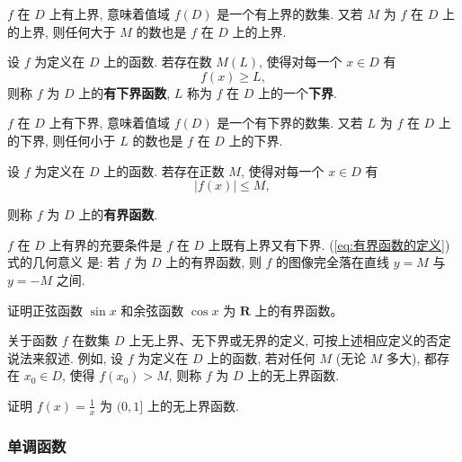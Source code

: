 $f$ 在 $D$ 上有上界, 意味着值域 $f(D)$ 是一个有上界的数集. 又若 $M$ 为 $f$ 在 $D$ 上的上界, 则任何大于 $M$ 的数也是 $f$ 在 $D$ 上的上界.

\begin{definition}[有下界函数]
    设 $f$ 为定义在 $D$ 上的函数. 若存在数 $M(L)$, 使得对每一个 $x \in D$ 有
    $$
    f(x) \geqslant L,
    $$
    则称 $f$ 为 $D$ 上的\textcolor{third}{\bf 有下界函数}, $L$ 称为 $f$ 在 $D$ 上的一个\textcolor{third}{\bf 下界}.
\end{definition}

$f$ 在 $D$ 上有下界, 意味着值域 $f(D)$ 是一个有下界的数集. 又若 $L$ 为 $f$ 在 $D$ 上的下界, 则任何小于 $L$ 的数也是 $f$ 在 $D$ 上的下界.

\begin{definition}[有界函数]
    设 $f$ 为定义在 $D$ 上的函数. 若存在正数 $M$, 使得对每一个 $x \in D$ 有
    \begin{equation}
    \mid f(x)\mid \leqslant M \text {, }
    \label{eq:有界函数的定义}
    \end{equation}
    
    则称 $f$ 为 $D$ 上的\textcolor{third}{\bf 有界函数}.
\end{definition}

$f$ 在 $D$ 上有界的充要条件是 $f$ 在 $D$ 上既有上界又有下界. (\ref{eq:有界函数的定义})式的几何意义 是: 若 $f$ 为 $D$ 上的有界函数, 则 $f$ 的图像完全落在直线 $y=M$ 与 $y=-M$ 之间.

\vspace{0.5cm}
\begin{exercise}
    证明正弦函数 $\sin x$ 和余弦函数 $\cos x$ 为 $\mathbf{R}$ 上的有界函数。
\end{exercise}
\vspace{0.5cm}

关于函数 $f$ 在数集 $D$ 上无上界、无下界或无界的定义, 可按上述相应定义的否定说法来叙述. 例如, 设 $f$ 为定义在 $D$ 上的函数, 若对任何 $M$ (无论 $M$ 多大), 都存在 $x_0 \in D$, 使得 $f\left(x_0\right)>M$, 则称 $f$ 为 $D$ 上的无上界函数.

\vspace{0.5cm}
\begin{exercise}
    证明 $f(x)=\frac{1}{x}$ 为 $(0,1]$ 上的无上界函数.
\end{exercise}
\vspace{0.5cm}

\subsubsection{单调函数}

